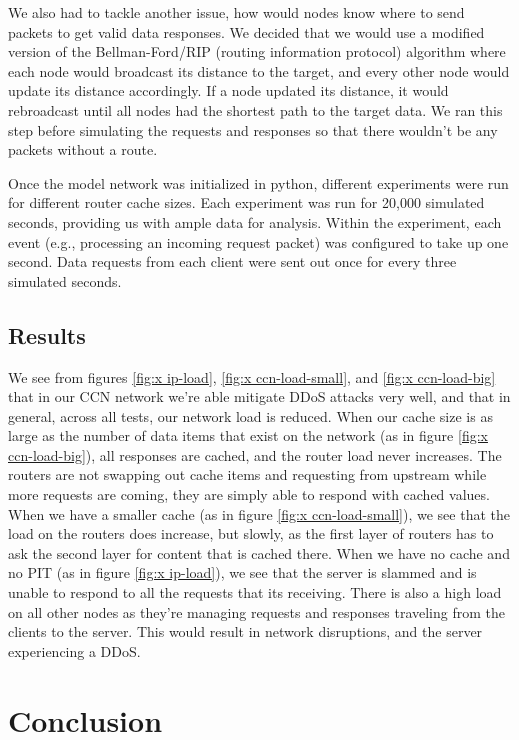 \documentclass[conference,compsoc, 10pt]{IEEEtran}
\begin{document}
We also had to tackle another issue, how would nodes know where to send packets to get valid data responses. We decided that we would use a modified version of the Bellman-Ford/RIP (routing information protocol) algorithm where each node would broadcast its distance to the target, and every other node would update its distance accordingly. If a node updated its distance, it would rebroadcast until all nodes had the shortest path to the target data. We ran this step before simulating the requests and responses so that there wouldn't be any packets without a route. 

Once the model network was initialized in python, different experiments were run for different router cache sizes. Each experiment was run for 20,000 simulated seconds, providing us with ample data for analysis. Within the experiment, each event (e.g., processing an incoming request packet) was configured to take up one second. Data requests from each client were sent out once for every three simulated seconds.


\subsection{Results}

We see from figures \ref{fig:x ip-load}, \ref{fig:x ccn-load-small}, and \ref{fig:x ccn-load-big} that in our CCN network we're able mitigate DDoS attacks very well, and that in general, across all tests, our network load is reduced. When our cache size is as large as the number of data items that exist on the network (as in figure \ref{fig:x ccn-load-big}), all responses are cached, and the router load never increases. The routers are not swapping out cache items and requesting from upstream while more requests are coming, they are simply able to respond with cached values. When we have a smaller cache (as in figure \ref{fig:x ccn-load-small}), we see that the load on the routers does increase, but slowly, as the first layer of routers has to ask the second layer for content that is cached there. When we have no cache and no PIT (as in figure \ref{fig:x ip-load}), we see that the server is slammed and is unable to respond to all the requests that its receiving. There is also a high load on all other nodes as they're managing requests and responses traveling from the clients to the server. This would result in network disruptions, and the server experiencing a DDoS.


\section{Conclusion}
\end{document}
